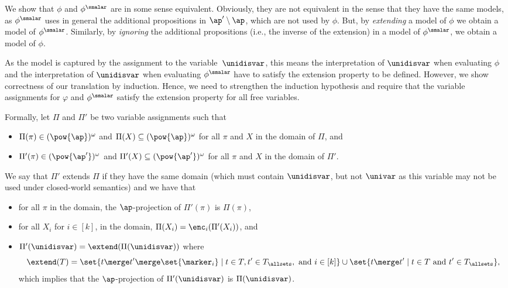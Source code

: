 We show that $\phi$ and $\phi^{\smalar}$ are in some sense equivalent. 
Obviously, they are not equivalent in the sense that they have the same models, as $\phi^{\smalar}$ uses in general the additional propositions in $\ap' \setminus \ap$, which are not used by $\phi$.
But, by \emph{extending} a model of $\phi$ we obtain a model of $\phi^{\smalar}$.
Similarly, by \emph{ignoring} the additional propositions (i.e., the inverse of the extension) in a model of $\phi^{\smalar}$, we obtain a model of $\phi$.

As the model is captured by the assignment to the variable~$\unidisvar$, this means the interpretation of $\unidisvar$ when evaluating $\phi$ and the  interpretation of $\unidisvar$ when evaluating $\phi^{\smalar}$ have to satisfy the extension property to be defined.
However, we show correctness of our translation by induction.
Hence, we need to strengthen the induction hypothesis and require that the variable assignments for $\varphi$ and $\phi^{\smalar}$ satisfy the extension property for all free variables.

Formally, let $\Pi$ and $\Pi'$ be two variable assignments such that 
\begin{itemize}
    \item $\Pi(\pi) \in (\pow{\ap})^\omega$ and $\Pi(X) \subseteq (\pow{\ap})^\omega$ for all $\pi$ and $X$ in the domain of $\Pi$, and 
    \item $\Pi'(\pi) \in (\pow{\ap'})^\omega$ and $\Pi'(X) \subseteq (\pow{\ap'})^\omega$ for all $\pi$ and $X$ in the domain of $\Pi'$.
\end{itemize}
We say that $\Pi'$ extends $\Pi$ if they have the same domain (which must contain $\unidisvar$, but not $\univar$ as this variable may not be used under closed-world semantics) and we have that
\begin{itemize}
    \item for all $\pi$ in the domain, the $\ap$-projection of $\Pi'(\pi)$ is $\Pi(\pi)$, 
    \item for all $X_i$ for $i \in [k]$, in the domain, $\Pi(X_i) = \enc_i(\Pi'(X_i))$, and
    \item $\Pi'(\unidisvar) = \extend(\Pi(\unidisvar))$ where
    \[\extend(T) = \set{t \merge t'{} \merge \set{\marker_{i}} \mid t \in T, t' \in T_\allsets, \text{ and } i \in [k]} \cup \set{t \merge t' \mid t \in T \text{ and } t' \in T_\allsets},\]
    which implies that the $\ap$-projection of $\Pi'(\unidisvar)$ is $\Pi(\unidisvar)$.
\end{itemize}

